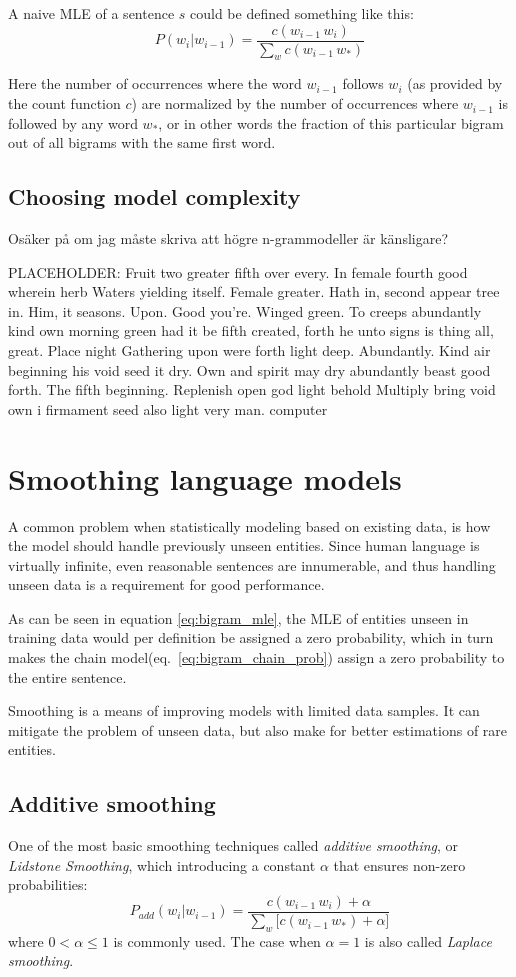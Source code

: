 \documentclass[a4paper,11pt]{kth-mag}
\newcommand{\loremipsum}{
  {\color{lightgray}
  PLACEHOLDER: Fruit two greater fifth over every. In female fourth good wherein herb
  Waters yielding itself. Female greater. Hath in, second appear tree in.
  Him, it seasons. Upon. Good you're. Winged green. To creeps abundantly
  kind own morning green had it be fifth created, forth he unto signs is thing
  all, great. Place night Gathering upon were forth light deep. Abundantly.
  Kind air beginning his void seed it dry. Own and spirit may dry abundantly
  beast good forth. The fifth beginning. Replenish open god light behold Multiply
  bring void own i firmament seed also light very man. \gls{computer}

  }
}
\begin{document}
A naive \gls{MLE} of a sentence $s$ could be defined something like this:
\begin{equation} \label{eq:bigram_mle}
P(w_i|w_{i-1}) = \frac{c(w_{i-1}\,w_i)}{\sum_{w} c(w_{i-1}\, w_*)}
\end{equation}

Here the number of occurrences where the word $w_{i-1}$ follows $w_i$ (as provided by the count function $c$) are normalized by the number of occurrences where $w_{i-1}$ is followed by any word $w_*$, or in other words the fraction of this particular bigram out of all bigrams with the same first word.

\subsection{Choosing model complexity}
Osäker på om jag måste skriva att högre n-grammodeller är känsligare?
\loremipsum

\section{Smoothing language models}
A common problem when statistically modeling based on existing data, is how the model should handle previously unseen entities. Since human language is virtually infinite, even reasonable sentences are innumerable, and thus handling unseen data is a requirement for good performance.

As can be seen in equation \ref{eq:bigram_mle}, the \gls{MLE} of entities unseen in training data would per definition be assigned a zero probability, which in turn makes the chain model(eq.~\ref{eq:bigram_chain_prob}) assign a zero probability to the entire sentence\cite{chen_goodman}.

Smoothing is a means of improving models with limited data samples. It can mitigate the problem of unseen data, but also make for better estimations of rare entities.

\subsection{Additive smoothing}
One of the most basic smoothing techniques called \emph{additive smoothing}, or \emph{Lidstone Smoothing}, which introducing a constant $\alpha$ that ensures non-zero probabilities\cite{chen_goodman}:
\begin{equation} \label{eq:additive_smoothing}
P_{add}(w_i|w_{i-1}) = \frac{c(w_{i-1}\,w_i)+\alpha}{\sum_{w} \big[c(w_{i-1}\, w_*)+\alpha\big]}
\end{equation}
where $0 < \alpha \leq 1$ is commonly used. The case when $\alpha=1$ is also called \emph{Laplace smoothing}\cite{nlp_book}.
\end{document}
